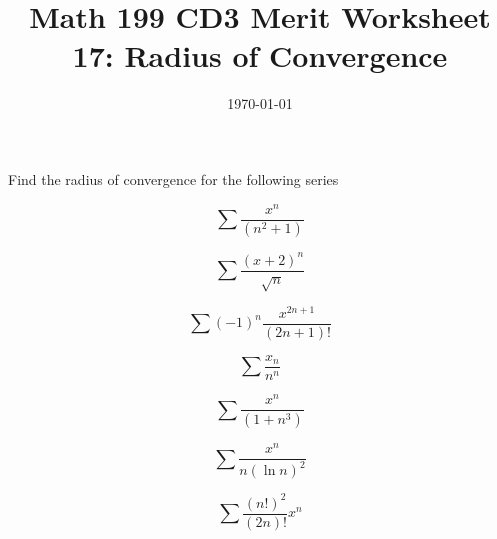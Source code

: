 
\usepackage{fullpage,amsmath,amssymb,amsthm}

\newcommand{\D}{\displaystyle}

\title{Math 199 CD3 Merit Worksheet 17:  Radius of Convergence}
\date{\today}




\maketitle
Find the radius of convergence for the following series
\be

	\item $$\sum \frac{x^n}{(n^2+1)}$$
	\vfill
	\item $$\sum\frac{(x+2)^n}{\sqrt n}$$
	\vfill
	\item $$\sum(-1)^n\frac{x^{2n+1}}{(2n+1)!}$$
	\vfill
	\item $$\sum\frac{x_n}{n^n}$$
	\vfill 
	\newpage
	\item $$\sum \frac{x^n}{(1+n^3)}$$
	\vfill
	\item $$\sum \frac{x^n}{n(\ln n)^2}$$
	\vfill
	\item $$\sum\frac{(n!)^2}{(2n)!}x^n$$\vfill
\ee

